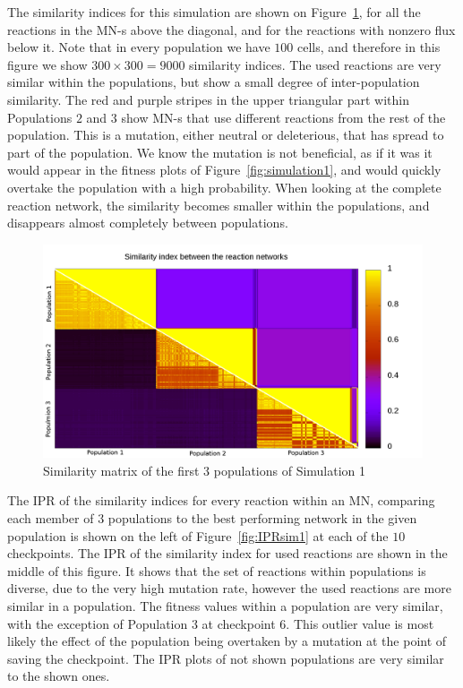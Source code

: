 \documentclass[a4paper,12pt]{article}
\begin{document}
The similarity indices for this simulation are shown on Figure~\ref{fig:simmatrix_firstjob}, for all the reactions in the MN-s above the diagonal, and for the reactions with nonzero flux below it. Note that in every population we have $100$ cells, and therefore in this figure we show $300 \times 300 = 9000$ similarity indices.  The used reactions are very similar within the populations, but show a small degree of inter-population similarity. The red and purple stripes in the upper triangular part within Populations $2$ and $3$ show MN-s that use different reactions from the rest of the population. This is a mutation, either neutral or deleterious, that has spread to part of the population. We know the mutation is not beneficial, as if it was it would appear in the fitness plots of Figure~\ref{fig:simulation1}, and would quickly overtake the population with a high probability. When looking at the complete reaction network, the similarity becomes smaller within the populations, and disappears almost completely between populations. 

\begin{figure}[htpb]
	\centering
	\includegraphics[width=1\linewidth]{simmatrix_firstjob.png}
	\caption{Similarity matrix of the first 3 populations of Simulation 1}
	\label{fig:simmatrix_firstjob}
\end{figure}

The IPR of the similarity indices for every reaction within an MN, comparing each member of $3$ populations to the best performing network in the given population is shown on the left of Figure~\ref{fig:IPRsim1} at each of the $10$ checkpoints. The IPR of the similarity index for used reactions are shown in the middle of this figure.  It shows that the set of reactions within populations is diverse, due to the very high mutation rate, however the used reactions are more similar in a population. The fitness values within a population are very similar, with the exception of Population $3$ at checkpoint $6$. This outlier value is most likely the effect of the population being overtaken by a mutation at the point of saving the checkpoint. The IPR plots of not shown populations are very similar to the shown ones. 
\end{document}
